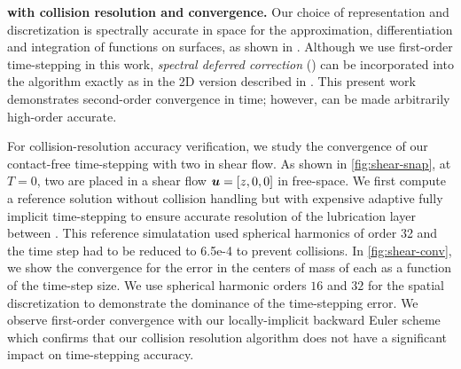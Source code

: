 \textbf{\rbcs with collision resolution and convergence. }
Our choice of \rbc  representation and discretization is spectrally
accurate in space for the approximation, differentiation and
integration of functions on \rbc  surfaces, as shown in
\cite{Veerapaneni2011}. Although we use first-order time-stepping in
this work,   \emph{spectral deferred correction} () can be
incorporated into the algorithm exactly as in the 2D version described
in  \cite{lu2017}. This present work demonstrates second-order convergence in
time; however,  can be made arbitrarily high-order
accurate.

For collision-resolution accuracy verification, we study the
convergence of our contact-free time-stepping with two \rbcs in shear
flow. As shown in \cref{fig:shear-snap}, at $T=0$, two \rbcs are
placed in a
shear flow ${\bm{u}} = [z,0,0]$ in free-space. %
We first compute a reference solution without
collision handling  but with expensive adaptive fully implicit time-stepping to
ensure accurate resolution of the lubrication
layer between \rbcs. This reference simulatation used spherical
harmonics of order 32 and the time step had to be reduced to
6.5e-4 to prevent collisions.
In \cref{fig:shear-conv}, we show the convergence for the error in the centers of mass of each \rbc as a function of the time-step size. 
We use spherical harmonic orders $16$ and $32$ for the spatial
discretization to demonstrate the dominance of the time-stepping error. 
We observe first-order convergence with our locally-implicit backward Euler scheme which confirms that our collision resolution algorithm does not have a significant impact on time-stepping accuracy.
\begin{figure}[!htb]
  \centering
  \vspace{-5pt}
\end{figure}%

